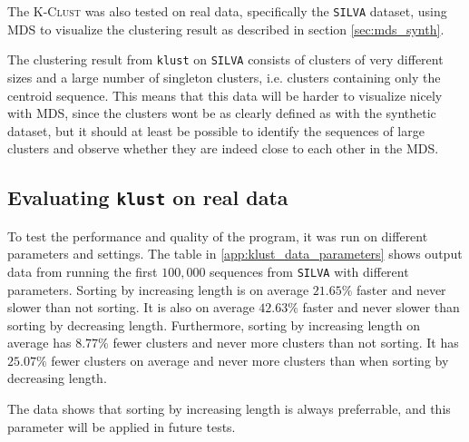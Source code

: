 The \textsc{K-Clust} was also tested on real data, specifically the
\texttt{SILVA} dataset, using MDS to visualize the clustering result as
described in section \ref{sec:mds_synth}.

The clustering result from \texttt{klust} on \texttt{SILVA} consists of
clusters of very different sizes and a large number of singleton clusters, i.e.
clusters containing only the centroid sequence. This means that this data will
be harder to visualize nicely with MDS, since the clusters wont be as clearly
defined as with the synthetic dataset, but it should at least be possible to
identify the sequences of large clusters and observe whether they are indeed
close to each other in the MDS.


\subsection{Evaluating \texttt{klust} on real data}



To test the performance and quality of the program, it was run on different
parameters and settings. The table in \ref{app:klust_data_parameters} shows
output data from running the first $100,000$ sequences from \texttt{SILVA}
with different parameters. Sorting by increasing length is on average
$21.65\%$ faster and never slower than not sorting. It is also on average
$42.63\%$ faster and never slower than sorting by decreasing length.
Furthermore, sorting by increasing length on average has $8.77\%$ fewer
clusters and never more clusters than not sorting. It has $25.07\%$ fewer
clusters on average and never more clusters than when sorting by decreasing
length.

The data shows that sorting by increasing length is always preferrable, and
this parameter will be applied in future tests.

